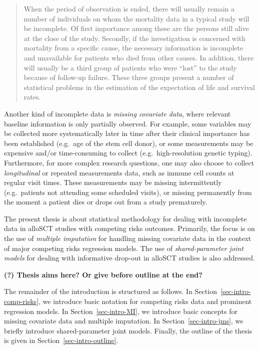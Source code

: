 \documentclass[
  letterpaper,
  DIV=11,
  numbers=noendperiod]{scrreprt}
\begin{document}
\begin{quote}
When the period of observation is ended, there will usually remain a
number of individuals on whom the mortality data in a typical study will
be incomplete. Of first importance among these are the persons still
alive at the close of the study. Secondly, if the investigation is
concerned with mortality from a specific cause, the necessary
information is incomplete and unavailable for patients who died from
other causes. In addition, there will usually be a third group of
patients who were ``lost'' to the study because of follow-up failure.
These three groups present a number of statistical problems in the
estimation of the expectation of life and survival rates.
\end{quote}

Another kind of incomplete data is \emph{missing covariate data}, where
relevant baseline information is only partially observed. For example,
some variables may be collected more systematically later in time after
their clinical importance has been established (e.g.~age of the stem
cell donor), or some measurements may be expensive and/or time-consuming
to collect (e.g.~high-resolution genetic typing). Furthermore, for more
complex research questions, one may also choose to collect
\emph{longitudinal} or repeated measurements data, such as immune cell
counts at regular visit times. These measurements may be missing
intermittently (e.g.~patients not attending some scheduled visits), or
missing permanently from the moment a patient dies or drops out from a
study prematurely.

The present thesis is about statistical methodology for dealing with
incomplete data in alloSCT studies with competing risks outcomes.
Primarily, the focus is on the use of \emph{multiple imputation} for
handling missing covariate data in the context of major competing risks
regression models. The use of \emph{shared-parameter joint models} for
dealing with informative drop-out in alloSCT studies is also addressed.

\textbf{(?) Thesis aims here? Or give before outline at the end?}

The remainder of the introduction is structured as follows. In
Section~\ref{sec-intro-comp-risks}, we introduce basic notation for
competing risks data and prominent regression models. In
Section~\ref{sec-intro-MI}, we introduce basic concepts for missing
covariate data and multiple imputation. In Section~\ref{sec-intro-jms},
we briefly introduce shared-parameter joint models. Finally, the outline
of the thesis is given in Section~\ref{sec-intro-outline}.
\end{document}
